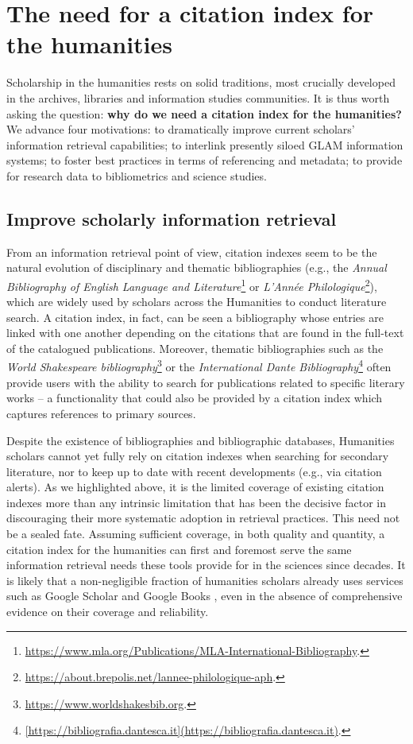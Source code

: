 \section{The need for a citation index for the humanities}\label{sec:citation-index-AH-needs}

Scholarship in the humanities rests on solid traditions, most crucially developed in the archives, libraries and information studies communities. It is thus worth asking the question: \textbf{why do we need a citation index for the humanities?} We advance four motivations: to dramatically improve current scholars’ information retrieval capabilities; to interlink presently siloed GLAM information systems; to foster best practices in terms of referencing and metadata; to provide for research data to bibliometrics and science studies.

\subsection{Improve scholarly information retrieval}

From an information retrieval point of view, citation indexes seem to be the natural evolution of disciplinary and thematic bibliographies (e.g., the \textit{Annual Bibliography of English Language and Literature}\footnote{\url{https://www.mla.org/Publications/MLA-International-Bibliography}.} or \textit{L'Année Philologique}\footnote{\url{https://about.brepolis.net/lannee-philologique-aph}.}), which are widely used by scholars across the Humanities to conduct literature search. A citation index, in fact, can be seen a bibliography whose entries are linked with one another depending on the citations that are found in the full-text of the catalogued publications. Moreover, thematic bibliographies such as the \textit{World Shakespeare bibliography}\footnote{\url{https://www.worldshakesbib.org}.} or the \textit{International Dante Bibliography}\footnote{\url{[https://bibliografia.dantesca.it](https://bibliografia.dantesca.it)}.} often provide users with the ability to search for publications related to specific literary works -- a functionality that could also be provided by a citation index which captures references to primary sources.

Despite the existence of bibliographies and bibliographic databases, Humanities scholars cannot yet fully rely on citation indexes when searching for secondary literature, nor to keep up to date with recent developments (e.g., via citation alerts). As we highlighted above, it is the limited coverage of existing citation indexes more than any intrinsic limitation that has been the decisive factor in discouraging their more systematic adoption in retrieval practices. This need not be a sealed fate. Assuming sufficient coverage, in both quality and quantity, a citation index for the humanities can first and foremost serve the same information retrieval needs these tools provide for in the sciences since decades. It is likely that a non-negligible fraction of humanities scholars already uses services such as Google Scholar and Google Books \cite{chen_exploring_2019}, even in the absence of comprehensive evidence on their coverage and reliability.
 
